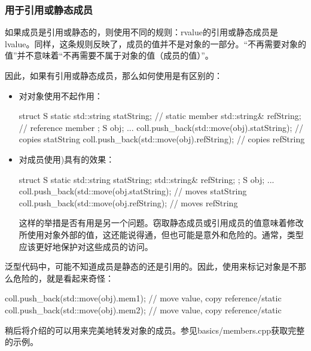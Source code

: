 \subsubsection{用于引用或静态成员}

如果成员是引用或静态的，则使用不同的规则：rvalue的引用或静态成员是lvalue。同样，这条规则反映了，成员的值并不是对象的一部分。“不再需要对象的值”并不意味着“不再需要不属于对象的值（成员的值）”。

因此，如果有引用或静态成员，那么如何使用是有区别的：

\begin{itemize}
	\item 对对象使用不起作用：

	\begin{cppcode}
struct S {
	static std::string statString; // static member
	std::string& refString; // reference member
};
S obj;
...
coll.push_back(std::move(obj).statString); // copies statString
coll.push_back(std::move(obj).refString); // copies refString
	\end{cppcode}
	\item 对成员使用)具有的效果：

	\begin{cppcode}
struct S {
	static std::string statString;
	std::string& refString;
};
S obj;
...
coll.push_back(std::move(obj.statString); // moves statString
coll.push_back(std::move(obj.refString); // moves refString
	\end{cppcode}
	这样的举措是否有用是另一个问题。窃取静态成员或引用成员的值意味着修改所使用对象外部的值，这还能说得通，但也可能是意外和危险的。通常，类型应该更好地保护对这些成员的访问。

\end{itemize}

泛型代码中，可能不知道成员是静态的还是引用的。因此，使用来标记对象是不那么危险的，就是看起来奇怪：

\begin{cppcode}
coll.push_back(std::move(obj).mem1); // move value, copy reference/static
coll.push_back(std::move(obj).mem2); // move value, copy reference/static
\end{cppcode}

稍后将介绍的可以用来完美地转发对象的成员。参见basics/members.cpp获取完整的示例。
























